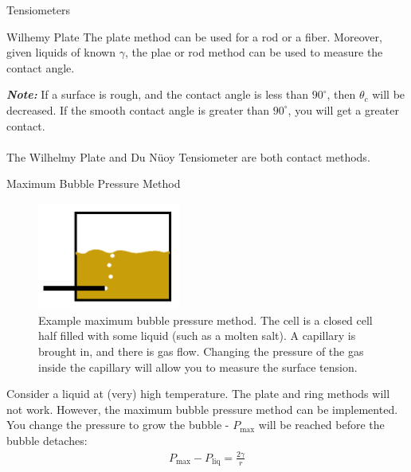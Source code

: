 \documentclass{article}
\newcommand{\note}[1]{\vspace{\parsep}\textbf{\textit{Note: }}#1\\\\}
\begin{document}
\begin{section}{Tensiometers}
\begin{subsection}{Wilhemy Plate}
The plate method can be used for a rod or a fiber. Moreover, given liquids of known $\gamma$, the plae or rod method can be used to measure the contact angle. 


\note{If a surface is rough, and the contact angle is less than $90^\circ$,  then $\theta_c$ will be decreased. If the smooth contact angle is greater than $90^\circ$, you will get a greater contact.}
The Wilhelmy Plate and Du N\"uoy Tensiometer are both contact methods.
\end{subsection}
\begin{subsection}{Maximum Bubble Pressure Method}
	\begin{figure}[h]
		\centering
		\includegraphics[height=100pt]{minimumPressure}
		\caption{Example maximum bubble pressure method. The cell is a closed cell half filled with some liquid (such as a molten salt). A capillary is brought in, and there is gas flow. Changing the pressure of the gas inside the capillary will allow you to measure the surface tension.}
		\label{fig:minimumPressure}
	\end{figure}
	Consider a liquid at (very) high temperature. The plate and ring methods will not work. However, the maximum bubble pressure method can be implemented.
	You change the pressure to grow the bubble - $P_\text{max}$ will be reached before the bubble detaches: 
	\begin{align*}
	P_\text{max} - P_\text{liq} = \frac{2\gamma}{r}
	\end{align*}
\end{subsection}
\end{section}
\newpage
\end{document}
